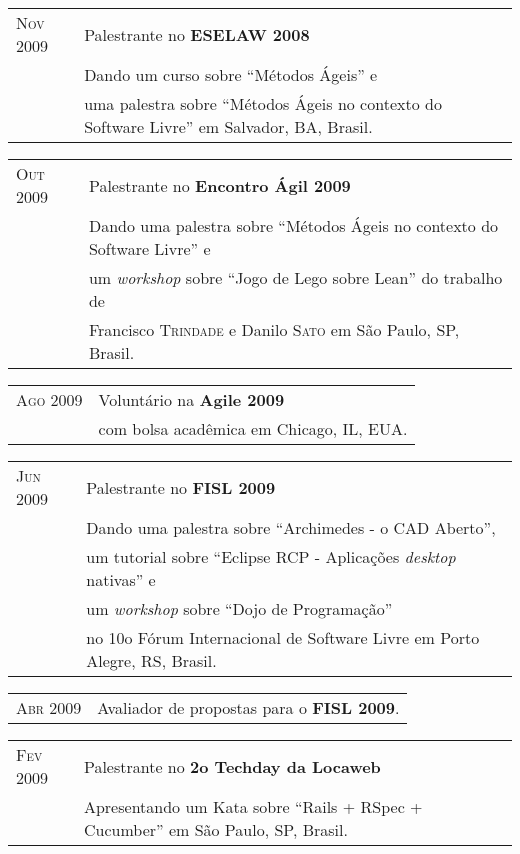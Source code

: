 \documentclass[letter,10pt]{article}
\begin{document}
\begin{tabular}{p{2.5cm}l}
  \textsc{Nov 2009} & Palestrante no \textbf{ESELAW 2008}\\
  &Dando um curso sobre ``Métodos Ágeis'' e\\
  &uma palestra sobre ``Métodos Ágeis no contexto do Software Livre'' em Salvador, BA, Brasil.\\
\end{tabular}

\begin{tabular}{p{2.5cm}l}
  \textsc{Out 2009} & Palestrante no \textbf{Encontro Ágil 2009}\\
  &Dando uma palestra sobre ``Métodos Ágeis no contexto do Software Livre'' e\\
  &um \textit{workshop} sobre ``Jogo de Lego sobre Lean'' do trabalho de\\
  &Francisco \textsc{Trindade} e Danilo \textsc{Sato} em São Paulo, SP, Brasil.\\
\end{tabular}

\begin{tabular}{p{2.5cm}l}
  \textsc{Ago 2009} & Voluntário na \textbf{Agile 2009}\\
  & com bolsa acadêmica em Chicago, IL, EUA.\\
\end{tabular}

\begin{tabular}{p{2.5cm}l}
  \textsc{Jun 2009} & Palestrante no \textbf{FISL 2009}\\
  &Dando uma palestra sobre ``Archimedes - o CAD Aberto'',\\
  & um tutorial sobre ``Eclipse RCP - Aplicações \textit{desktop} nativas'' e\\
  & um \textit{workshop} sobre ``Dojo de Programação''\\
  & no 10o Fórum Internacional de Software Livre em Porto
  Alegre, RS, Brasil.
\end{tabular}

\begin{tabular}{p{2.5cm}l}
  \textsc{Abr 2009} & Avaliador de propostas para o \textbf{FISL 2009}.\\
\end{tabular}

\begin{tabular}{p{2.5cm}l}
  \textsc{Fev 2009} & Palestrante no \textbf{2o Techday da Locaweb}\\
  & Apresentando um Kata sobre ``Rails + RSpec + Cucumber'' em São Paulo, SP, Brasil.\\
\end{tabular}
\end{document}
